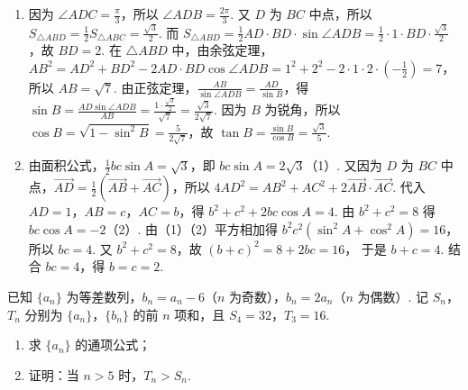 \begin{solution}
\begin{enumerate}
\item 因为 \(\angle ADC=\frac{\pi}{3}\)，所以 \(\angle ADB=\frac{2\pi}{3}\).
又 \(D\) 为 \(BC\) 中点，所以 \(S_{\triangle ABD}=\frac12S_{\triangle ABC}=\frac{\sqrt3}{2}\).
而 \(S_{\triangle ABD}=\frac12 AD\cdot BD\cdot \sin\angle ADB=\frac12\cdot 1\cdot BD\cdot \frac{\sqrt3}{2}\)，故 \(BD=2\).
	在 \(\triangle ABD\) 中，由余弦定理，\(AB^2=AD^2+BD^2-2AD\cdot BD\cos\angle ADB=1^2+2^2-2\cdot 1\cdot 2\cdot\left(-\frac12\right)=7\)，所以 \(AB=\sqrt7\).
由正弦定理，\(\frac{AB}{\sin\angle ADB}=\frac{AD}{\sin B}\)，得
\(\sin B=\frac{AD\sin\angle ADB}{AB}=\frac{1\cdot \frac{\sqrt3}{2}}{\sqrt7}=\frac{\sqrt3}{2\sqrt7}\).
因为 \(B\) 为锐角，所以 \(\cos B=\sqrt{1-\sin^2B}=\frac{5}{2\sqrt7}\)，故
\(\tan B=\frac{\sin B}{\cos B}=\frac{\sqrt3}{5}\).

\item 由面积公式，\(\frac12bc\sin A=\sqrt3\)，即 \(bc\sin A=2\sqrt3\)（1）.
	又因为 \(D\) 为 \(BC\) 中点，\(\overrightarrow{AD}=\frac12(\overrightarrow{AB}+\overrightarrow{AC})\)，所以 \(4AD^2=AB^2+AC^2+2\overrightarrow{AB}\cdot\overrightarrow{AC}\). 代入 \(AD=1\)，\(AB=c\)，\(AC=b\)，得 \(b^2+c^2+2bc\cos A=4\).
由 \(b^2+c^2=8\) 得 \(bc\cos A=-2\)（2）.
由（1）（2）平方相加得 \(b^2c^2(\sin^2A+\cos^2A)=16\)，所以 \(bc=4\).
又 \(b^2+c^2=8\)，故 \((b+c)^2=8+2bc=16\)，
于是 \(b+c=4\). 结合 \(bc=4\)，得 \(b=c=2\).

\end{enumerate}
\end{solution}

\begin{problem}
已知 \(\{a_n\}\) 为等差数列，\(b_n=a_n-6\)（\(n\) 为奇数），\(b_n=2a_n\)（\(n\) 为偶数）. 记 \(S_n\)，\(T_n\) 分别为 \(\{a_n\}\)，\(\{b_n\}\) 的前 \(n\) 项和，且 \(S_4=32\)，\(T_3=16\).

\begin{enumerate}
\item 求 \(\{a_n\}\) 的通项公式；
\item 证明：当 \(n>5\) 时，\(T_n>S_n\).
\end{enumerate}
\end{problem}

